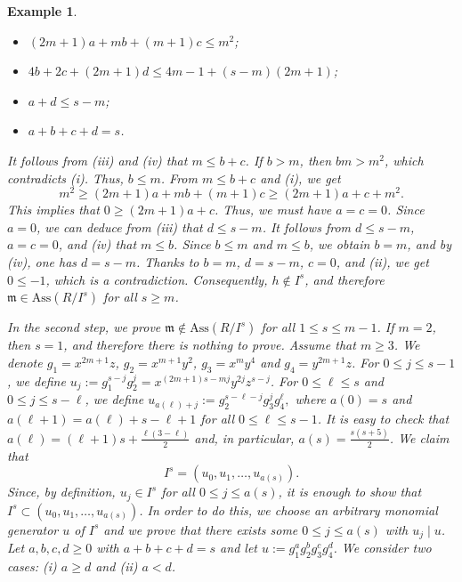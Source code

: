 \documentclass[11pt]{amsart}
\newtheorem{example}[theorem]{Example}
\begin{document}
\begin{example}
{  \begin{itemize}
\item[(i)] $(2m+1)a + mb + (m+1)c \leq m^2$;
\item[(ii)] $4b+2c+(2m+1)d \leq 4m-1+(s-m)(2m+1)$; 
\item[(iii)] $a+d \leq s-m$;
\item[(iv)] $a+b+c+d=s$. 
\end{itemize}
  
 It follows from (iii) and (iv) that $m\leq b+c$. If $b> m$, then $bm > m^2$, which contradicts (i). Thus, $b\leq m$. From $m\leq b+c$ and (i), we get 
  $$m^2 \geq (2m+1)a + mb + (m+1)c \geq (2m+1)a + c+ m^2.$$ This implies that $0 \geq (2m+1)a+c$. Thus, we must have $a=c=0$. 
  Since $a=0$, we can deduce from (iii) that $d\leq s-m$. It follows from $d\leq s-m$, $a=c=0$,  and (iv) that $m\leq b$. Since $b\leq m$ and $m\leq b$, we obtain $b=m$, and by (iv), one has $d=s-m$.  Thanks to $b=m$, $d= s-m$, $c=0$, and (ii), we get $0\leq -1$, which is a contradiction. Consequently, $h\notin I^s$, and therefore 
   $\mathfrak{m} \in \mathrm{Ass}(R/I^s)$ for all $s\geq m$.
   
    In the  second  step,  we prove  $\mathfrak{m} \notin \mathrm{Ass}(R/I^s)$ for all  $1\leq s \leq m-1$.
    If $m=2$, then $s=1$, and therefore there is nothing to prove. Assume that $m\geq 3$.
We denote $g_1=x^{2m+1}z$, $g_2=x^{m+1}y^2$, $g_3=x^{m}y^4$ and $g_4=y^{2m+1}z$. 
For $0\leq j\leq s-1$, we define $u_j:=g_1^{s-j}g_2^j = x^{(2m+1)s-mj}y^{2j}z^{s-j}$. 
For $0\leq \ell \leq s$ and $0\leq j \leq s-\ell$, we define  $u_{a(\ell)+j}:=g_2^{s-\ell-j}g_3^jg_4^{\ell},$
where $a(0)=s$ and $a(\ell+1)=a(\ell)+s-\ell+1$  for all $0\leq \ell\leq s-1$.
It is easy to check that $a(\ell)=(\ell+1)s + \frac{\ell(3-\ell)}{2}$ and, in particular, 
$a(s)=\frac{s(s+5)}{2}$. We claim that
$$I^s=(u_0,u_1,\ldots,u_{a(s)}).$$
Since, by definition, $u_j\in I^s$ for all $0\leq j\leq a(s)$, it is enough to show 
that $I^s\subset (u_0,u_1,\ldots,u_{a(s)})$. In order to do this, we choose an arbitrary monomial 
generator $u$ of $I^s$  and we
prove that there exists some $0\leq j\leq a(s)$ with $u_j\mid u$. 
Let $a,b,c,d\geq 0$ with $a+b+c+d=s$ and let $u:=g_1^ag_2^bg_3^cg_4^d$. 
We consider two cases: (i) $a\geq d$ and (ii) $a<d$.

}
\end{example}
\end{document}

